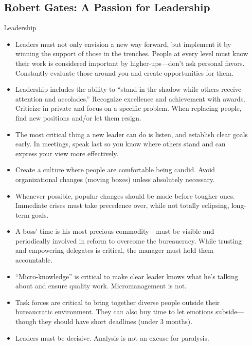 \documentclass[
]{article}
\begin{document}
\hypertarget{robert-gates-a-passion-for-leadership}{%
\subsection{Robert Gates: A Passion for
Leadership}\label{robert-gates-a-passion-for-leadership}}

Leadership

\begin{itemize}
\item
  Leaders must not only envision a new way forward, but implement it by
  winning the support of those in the trenches. People at every level
  must know their work is considered important by higher-ups---don't ask
  personal favors. Constantly evaluate those around you and create
  opportunities for them.
\item
  Leadership includes the ability to ``stand in the shadow while others
  receive attention and accolades.'' Recognize excellence and
  achievement with awards. Criticize in private and focus on a specific
  problem. When replacing people, find new positions and/or let them
  resign.
\item
  The most critical thing a new leader can do is listen, and establish
  clear goals early. In meetings, speak last so you know where others
  stand and can express your view more effectively.
\item
  Create a culture where people are comfortable being candid. Avoid
  organizational changes (moving boxes) unless absolutely necessary.
\item
  Whenever possible, popular changes should be made before tougher ones.
  Immediate crises must take precedence over, while not totally
  eclipsing, long-term goals.
\item
  A boss' time is his most precious commodity---must be visible and
  periodically involved in reform to overcome the bureaucracy. While
  trusting and empowering delegates is critical, the manager must hold
  them accountable.
\item
  ``Micro-knowledge'' is critical to make clear leader knows what he's
  talking about and ensure quality work. Micromanagement is not.
\item
  Task forces are critical to bring together diverse people outside
  their bureaucratic environment. They can also buy time to let emotions
  subside---though they should have short deadlines (under 3 months).
\item
  Leaders must be decisive. Analysis is not an excuse for paralysis.

\end{itemize}
\end{document}
